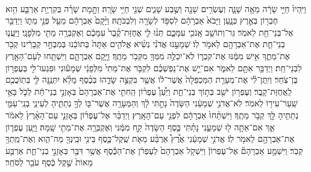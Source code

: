 \documentclass[twoside, openany, parskip=half, 11pt]{book}
\begin{document}
\begin{footnotesize}
\begin{multicols}{2}
\\
 וַיִּֽהְיוּ֙ חַיֵּ֣י שָׂרָ֔ה מֵאָ֥ה שָׁנָ֛ה וְעֶשְׂרִ֥ים שָׁנָ֖ה וְשֶׁ֣בַע שָׁנִ֑ים שְׁנֵ֖י חַיֵּ֥י שָׂרָֽה׃ וַתָּ֣מָת שָׂרָ֗ה בְּקִרְיַ֥ת אַרְבַּ֛ע הִ֥וא חֶבְר֖וֹן בְּאֶ֣רֶץ כְּנָ֑עַן וַיָּבֹא֙ אַבְרָהָ֔ם לִסְפֹּ֥ד לְשָׂרָ֖ה וְלִבְכֹּתָֽהּ׃ וַיָּ֨קָם֙ אַבְרָהָ֔ם מֵעַ֖ל פְּנֵ֣י מֵת֑וֹ וַיְדַבֵּ֥ר אֶל־בְּנֵי־חֵ֖ת לֵאמֹֽר׃ גֵּר־וְתוֹשָׁ֥ב אָֽנֹכִ֖י עִמָּכֶ֑ם תְּנ֨וּ לִ֤י אֲחֻזַּת־קֶ֨בֶר֙ עִמָּכֶ֔ם וְאֶקְבְּרָ֥ה מֵתִ֖י מִלְּפָנָֽי׃ וַיַּֽעֲנ֧וּ בְנֵי־חֵ֛ת אֶת־אַבְרָהָ֖ם לֵאמֹ֥ר לֽוֹ׃ שְׁמָעֵ֣נוּ אֲדֹנִ֗י נְשִׂ֨יא אֱלֹהִ֤ים אַתָּה֙ בְּתוֹכֵ֔נוּ בְּמִבְחַ֣ר קְבָרֵ֔ינוּ קְבֹ֖ר אֶת־מֵתֶ֑ךָ אִ֣ישׁ מִמֶּ֔נּוּ אֶת־קִבְר֛וֹ לֹֽא־יִכְלֶ֥ה מִמְּךָ֖ מִקְּבֹ֥ר מֵתֶֽךָ׃ וַיָּ֧קָם אַבְרָהָ֛ם וַיִּשְׁתַּ֥חוּ לְעַם־הָאָ֖רֶץ לִבְנֵי־חֵֽת׃  וַיְדַבֵּ֥ר אִתָּ֖ם לֵאמֹ֑ר אִם־יֵ֣שׁ אֶת־נַפְשְׁכֶ֗ם לִקְבֹּ֤ר אֶת־מֵתִי֙ מִלְּפָנַ֔י שְׁמָע֕וּנִי וּפִגְעוּ־לִ֖י בְּעֶפְר֥וֹן בֶּן־צֹֽחַר׃ וְיִֽתֶּן־לִ֗י אֶת־מְעָרַ֤ת הַמַּכְפֵּלָה֙ אֲשֶׁר־ל֔וֹ אֲשֶׁ֖ר בִּקְצֵ֣ה שָׂדֵ֑הוּ בְּכֶ֨סֶף מָלֵ֜א יִתְּנֶ֥נָּה לִּ֛י בְּתֽוֹכֲכֶ֖ם לַֽאֲחֻזַּת־קָֽבֶר׃ וְעֶפְר֥וֹן יֹשֵׁ֖ב בְּת֣וֹךְ בְּנֵי־חֵ֑ת וַיַּ֩עַן֩ עֶפְר֨וֹן הַֽחִתִּ֤י אֶת־אַבְרָהָם֙ בְּאָזְנֵ֣י בְנֵי־חֵ֔ת לְכֹ֛ל בָּאֵ֥י שַֽׁעַר־עִיר֖וֹ לֵאמֹֽר׃ לֹֽא־אֲדֹנִ֣י שְׁמָעֵ֔נִי הַשָּׂדֶה֙ נָתַ֣תִּי לָ֔ךְ וְהַמְּעָרָ֥ה אֲשֶׁר־בּ֖וֹ לְךָ֣ נְתַתִּ֑יהָ לְעֵינֵ֧י בְנֵֽי־עַמִּ֛י נְתַתִּ֥יהָ לָּ֖ךְ קְבֹ֥ר מֵתֶֽךָ׃ וַיִּשְׁתַּ֨חוּ֙ אַבְרָהָ֔ם לִפְנֵ֖י עַם־הָאָֽרֶץ׃  וַיְדַבֵּ֨ר אֶל־עֶפְר֜וֹן בְּאָזְנֵ֤י עַם־הָאָ֨רֶץ֙ לֵאמֹ֔ר אַ֛ךְ אִם־אַתָּ֥ה ל֖וּ שְׁמָעֵ֑נִי נָתַ֜תִּי כֶּ֤סֶף הַשָּׂדֶה֙ קַ֣ח מִמֶּ֔נִּי וְאֶקְבְּרָ֥ה אֶת־מֵתִ֖י שָֽׁמָּה׃ וַיַּ֧עַן עֶפְר֛וֹן אֶת־אַבְרָהָ֖ם לֵאמֹ֥ר לֽוֹ׃ אֲדֹנִ֣י שְׁמָעֵ֔נִי אֶ֩רֶץ֩ אַרְבַּ֨ע מֵאֹ֧ת שֶֽׁקֶל־כֶּ֛סֶף בֵּינִ֥י וּבֵֽינְךָ֖ מַה־הִ֑וא וְאֶת־מֵֽתְךָ֖ קְבֹֽר׃ וַיִּשְׁמַ֣ע אַבְרָהָם֘ אֶל־עֶפְרוֹן֒ וַיִּשְׁקֹ֤ל אַבְרָהָם֙ לְעֶפְרֹ֔ן אֶת־הַכֶּ֕סֶף אֲשֶׁ֥ר דִּבֶּ֖ר בְּאָזְנֵ֣י בְנֵי־חֵ֑ת אַרְבַּ֤ע מֵאוֹת֙ שֶׁ֣קֶל כֶּ֔סֶף עֹבֵ֖ר לַסֹּחֵֽר׃


\end{multicols}
\end{footnotesize}
\end{document}
